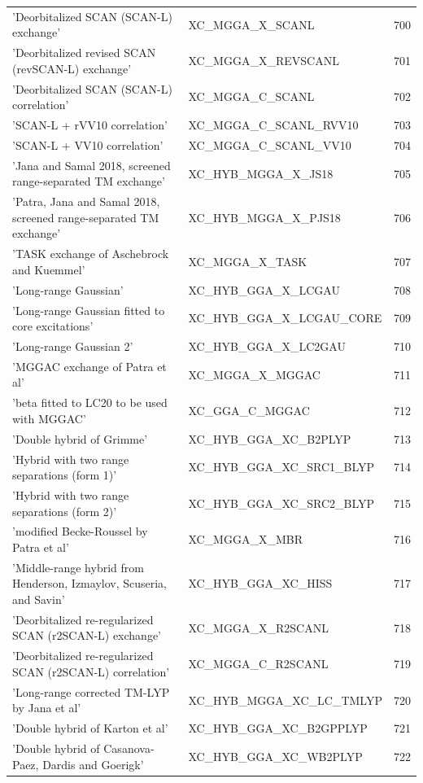 \documentclass[final,12pt,makeidx,DIV=calc]{article}
\begin{document}
{{{\begin{table}[!h]
\begin{center}
\begin{tabular}{llr}
  'Deorbitalized SCAN (SCAN-L) exchange' & XC\_MGGA\_X\_SCANL  &700\\
  'Deorbitalized revised SCAN (revSCAN-L) exchange' & XC\_MGGA\_X\_REVSCANL  &701\\
  'Deorbitalized SCAN (SCAN-L) correlation' & XC\_MGGA\_C\_SCANL  &702\\
  'SCAN-L + rVV10 correlation' & XC\_MGGA\_C\_SCANL\_RVV10  &703\\
  'SCAN-L + VV10 correlation' & XC\_MGGA\_C\_SCANL\_VV10  &704\\
  'Jana and Samal 2018, screened range-separated TM exchange' & XC\_HYB\_MGGA\_X\_JS18  &705\\
  'Patra, Jana and Samal 2018, screened range-separated TM exchange' & XC\_HYB\_MGGA\_X\_PJS18  &706\\
  'TASK exchange of Aschebrock and Kuemmel' & XC\_MGGA\_X\_TASK  &707\\
  'Long-range Gaussian' & XC\_HYB\_GGA\_X\_LCGAU  &708\\
  'Long-range Gaussian fitted to core excitations' & XC\_HYB\_GGA\_X\_LCGAU\_CORE  &709\\
  'Long-range Gaussian 2' & XC\_HYB\_GGA\_X\_LC2GAU  &710\\
  'MGGAC exchange of Patra et al' & XC\_MGGA\_X\_MGGAC  &711\\
  'beta fitted to LC20 to be used with MGGAC' & XC\_GGA\_C\_MGGAC  &712\\
  'Double hybrid of Grimme' & XC\_HYB\_GGA\_XC\_B2PLYP  &713\\
  'Hybrid with two range separations (form 1)' & XC\_HYB\_GGA\_XC\_SRC1\_BLYP  &714\\
  'Hybrid with two range separations (form 2)' & XC\_HYB\_GGA\_XC\_SRC2\_BLYP  &715\\
  'modified Becke-Roussel by Patra et al' & XC\_MGGA\_X\_MBR  &716\\
  'Middle-range hybrid from Henderson, Izmaylov, Scuseria, and Savin' & XC\_HYB\_GGA\_XC\_HISS  &717\\
  'Deorbitalized re-regularized SCAN (r2SCAN-L) exchange' & XC\_MGGA\_X\_R2SCANL  &718\\
  'Deorbitalized re-regularized SCAN (r2SCAN-L) correlation' & XC\_MGGA\_C\_R2SCANL  &719\\
  'Long-range corrected TM-LYP by Jana et al' & XC\_HYB\_MGGA\_XC\_LC\_TMLYP  &720\\
  'Double hybrid of Karton et al' & XC\_HYB\_GGA\_XC\_B2GPPLYP  &721\\
  'Double hybrid of Casanova-Paez, Dardis and Goerigk' & XC\_HYB\_GGA\_XC\_WB2PLYP  &722\\

\end{tabular}
\end{center}
\end{table}}}}
\end{document}
